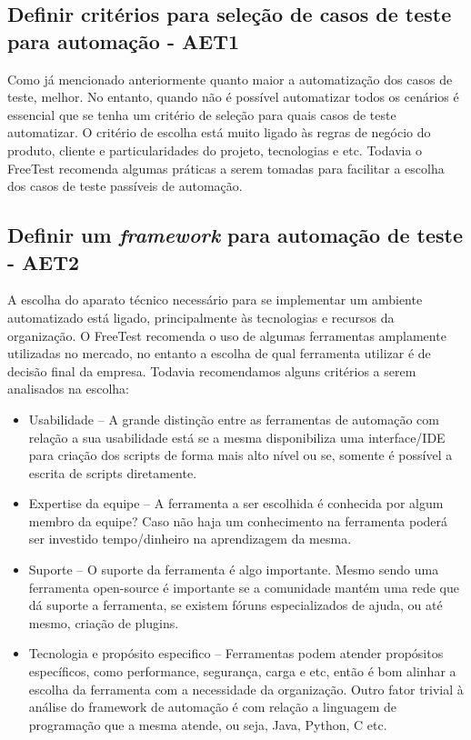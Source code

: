 \subsection{Definir critérios para seleção de casos de teste para automação - AET1}

Como já mencionado anteriormente quanto maior a automatização dos casos de teste, melhor. No entanto, quando não é possível automatizar todos os cenários é essencial que se tenha um critério de seleção para quais casos de teste automatizar. O critério de escolha está muito ligado às regras de negócio do produto, cliente e particularidades do projeto, tecnologias e etc. Todavia o FreeTest recomenda algumas práticas a serem tomadas para facilitar a escolha dos casos de teste passíveis de automação.

\subsection{Definir um \textit{framework} para automação de teste - AET2}

A escolha do aparato técnico necessário para se implementar um ambiente automatizado está ligado, principalmente às tecnologias e recursos da organização. O FreeTest recomenda o uso de algumas ferramentas amplamente utilizadas no mercado, no entanto a escolha de qual ferramenta utilizar é de decisão final da empresa. Todavia recomendamos alguns critérios a serem analisados na escolha:

\begin{itemize}
\item Usabilidade – A grande distinção entre as ferramentas de automação com relação a sua usabilidade está se a mesma disponibiliza uma interface/IDE para criação dos scripts de forma mais alto nível ou se, somente é possível a escrita de scripts diretamente.
\item Expertise da equipe – A ferramenta a ser escolhida é conhecida por algum membro da equipe? Caso não haja um conhecimento na ferramenta poderá ser investido tempo/dinheiro na aprendizagem da mesma.
\item Suporte – O suporte da ferramenta é algo importante. Mesmo sendo uma ferramenta open-source é importante se a comunidade mantém uma rede que dá suporte a ferramenta, se existem fóruns especializados de ajuda, ou até mesmo, criação de plugins.
\item Tecnologia e propósito especifico – Ferramentas podem atender propósitos específicos, como performance, segurança, carga e etc, então é bom alinhar a escolha da ferramenta com a necessidade da organização. Outro fator trivial à análise do framework de automação é com relação a linguagem de programação que a mesma atende, ou seja, Java, Python, C etc.
\end{itemize}

